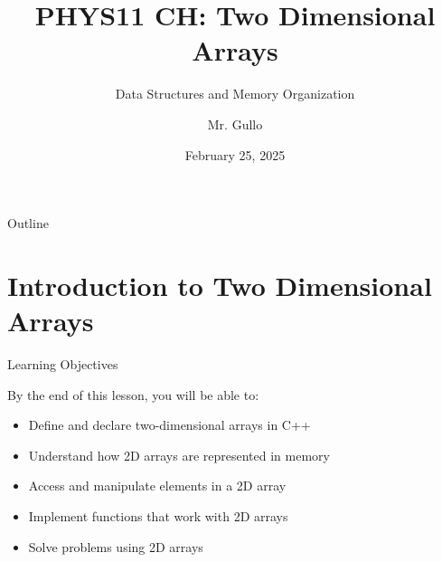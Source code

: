 \documentclass{beamer}
\title[2D Arrays]{PHYS11 CH: Two Dimensional Arrays}
\subtitle{Data Structures and Memory Organization}
\author[Mr. Gullo]{Mr. Gullo}
\date[Feb 2025]{February 25, 2025}
\institute{Computer Science Department}
\begin{document}
\begin{frame}
    \titlepage
\end{frame}

\begin{frame}{Outline}
    \tableofcontents
\end{frame}

\section{Introduction to Two Dimensional Arrays}

\begin{frame}{Learning Objectives}
    \begin{block}{By the end of this lesson, you will be able to:}
        \begin{itemize}
            \item Define and declare two-dimensional arrays in C++
            \item Understand how 2D arrays are represented in memory
            \item Access and manipulate elements in a 2D array
            \item Implement functions that work with 2D arrays
            \item Solve problems using 2D arrays
        \end{itemize}
    \end{block}
\end{frame}
\end{document}
